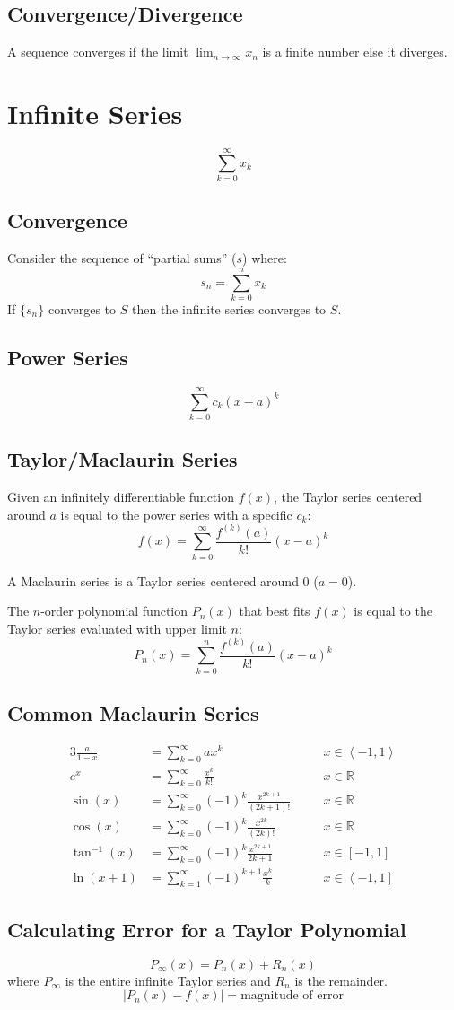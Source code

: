 \documentclass[12pt]{article}
\newcommand*{\R}{\mathbb{R}}
\newcommand*{\atan}{\tan^{-1}}
\newcommand*{\isum}[1][k]{\sum_{#1=0}^\infty}
\newenvironment{rmskip}{\setlength{\abovedisplayskip}{0pt}%
  \setlength{\belowdisplayskip}{0pt}\ignorespaces}%
  {\ignorespacesafterend}
\begin{document}
\subsection*{Convergence\slash Divergence}
A sequence converges if the limit \(\displaystyle\lim_{n \to \infty} x_n\) is
a finite number else it diverges.
\section*{Infinite Series}
\[
  \isum x_k
\]
\subsection*{Convergence}
Consider the sequence of ``partial sums'' (\(s\)) where:
\[
  s_n = \sum_{k=0}^n x_k
\]
If \(\{s_n\}\) converges to \(S\) then the infinite series converges to \(S\).
\subsection*{Power Series}
\[
  \isum c_k{(x-a)}^k
\]
\subsection*{Taylor\slash Maclaurin Series}
Given an infinitely differentiable function \(f(x)\), the Taylor series
centered around \(a\) is equal to the power series with a specific \(c_k\):
\[
  f(x) = \isum \frac{f^{(k)}(a)}{k!}{(x-a)}^k
\]

A Maclaurin series is a Taylor series centered around 0 (\(a = 0\)).

The \(n\)-order polynomial function \(P_n(x)\) that best fits \(f(x)\) is
equal to the Taylor series evaluated with upper limit \(n\):
\[
  P_n(x) = \sum_{k=0}^{n} \frac{f^{(k)}(a)}{k!}{(x-a)}^k
\]
\subsection*{Common Maclaurin Series}
\begin{rmskip}
  \begin{alignat*}{3}
    \frac{a}{1-x} &= \isum ax^k &&\quad x \in \left<-1,1\right>\\
    e^x &= \isum \frac{x^k}{k!} &&\quad x \in \R\\
    \sin(x) &= \isum {(-1)}^k \frac{x^{2k+1}}{(2k+1)!} &&\quad x \in \R\\
    \cos(x) &= \isum {(-1)}^k \frac{x^{2k}}{(2k)!} &&\quad x \in \R\\
    \atan(x) &= \isum {(-1)}^k \frac{x^{2k+1}}{2k+1} &&\quad x \in [-1,1]\\
    \ln(x+1) &= \sum_{k=1}^\infty {(-1)}^{k+1} \frac{x^k}{k} &&\quad x \in
      \left<-1,1\right]
  \end{alignat*}
\end{rmskip}
\subsection*{Calculating Error for a Taylor Polynomial}
\[
  P_\infty(x) = P_n(x) + R_n(x)
\]
where \(P_\infty\) is the entire infinite Taylor series and \(R_n\) is the
remainder.
\[
  |P_n(x) - f(x)| = \text{magnitude of error}
\]
\end{document}

